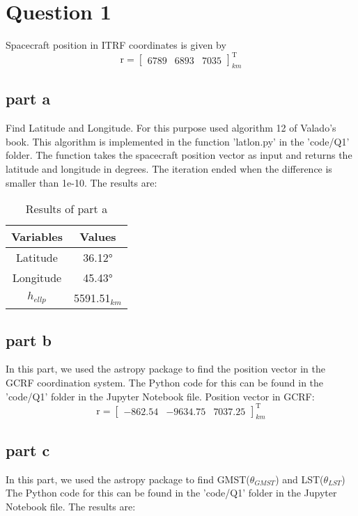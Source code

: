 \section{Question 1}

Spacecraft position in ITRF coordinates is given by
$$
\boldsymbol{\mathrm{r}} = 
\begin{bmatrix}
    6789 & 6893 & 7035
\end{bmatrix}^{\mathrm{T}}_{km}
$$

\subsection{part a}
Find Latitude and Longitude. For this purpose used algorithm 12 of Valado's book. This algorithm is implemented in the function 'latlon.py' in the 'code/Q1' folder. The function takes the spacecraft position vector as input and returns the latitude and longitude in degrees. The iteration ended when the difference is smaller than 1e-10. The results are:

\begin{table}[H]
    \caption{Results of part a}
    \begin{center}
        \begin{tabular}{|c|c|}
            \hline
            \Tstrut
            \textbf{Variables} & \textbf{Values} \\
            \hline
            Latitude & \ang{36.12} \\
            Longitude & \ang{45.43} \\
            $h_{ellp}$ & 5591.51$_{km}$ \\
            \hline
            \end{tabular}
    \end{center}
\end{table}

\subsection{part b}
In this part, we used the astropy package to find the position vector in the GCRF coordination system. The Python code for this can be found in the 'code/Q1' folder in the Jupyter Notebook file. Position vector in GCRF:
$$
\boldsymbol{\mathrm{r}} = 
\begin{bmatrix}
    -862.54 & -9634.75 & 7037.25
\end{bmatrix}^{\mathrm{T}}_{km}
$$

\subsection{part c}
In this part, we used the astropy package to find GMST($\theta_{GMST}$) and LST($\theta_{LST}$) The Python code for this can be found in the 'code/Q1' folder in the Jupyter Notebook file. The results are:

